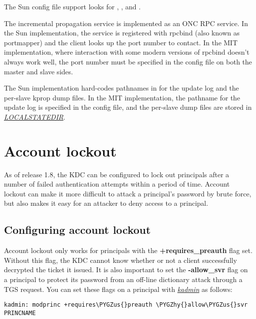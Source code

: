 \documentclass[letterpaper,10pt,english]{sphinxmanual}
\def\PYGZus{\char`\_}
\def\PYGZhy{\char`\-}
\begin{document}
The Sun config file support looks for ,
, and .

The incremental propagation service is implemented as an ONC RPC
service.  In the Sun implementation, the service is registered with
rpcbind (also known as portmapper) and the client looks up the port
number to contact.  In the MIT implementation, where interaction with
some modern versions of rpcbind doesn't always work well, the port
number must be specified in the config file on both the master and
slave sides.

The Sun implementation hard-codes pathnames in  for the
update log and the per-slave kprop dump files.  In the MIT
implementation, the pathname for the update log is specified in the
config file, and the per-slave dump files are stored in
{\hyperref[mitK5defaults:paths]{\emph{LOCALSTATEDIR}}}.


\chapter{Account lockout}
\label{admin/lockout::doc}\label{admin/lockout:account-lockout}
As of release 1.8, the KDC can be configured to lock out principals
after a number of failed authentication attempts within a period of
time.  Account lockout can make it more difficult to attack a
principal's password by brute force, but also makes it easy for an
attacker to deny access to a principal.


\section{Configuring account lockout}
\label{admin/lockout:configuring-account-lockout}
Account lockout only works for principals with the
\textbf{+requires\_preauth} flag set.  Without this flag, the KDC cannot
know whether or not a client successfully decrypted the ticket it
issued.  It is also important to set the \textbf{-allow\_svr} flag on a
principal to protect its password from an off-line dictionary attack
through a TGS request.  You can set these flags on a principal with
{\hyperref[admin/admin_commands/kadmin_local:kadmin-1]{\emph{kadmin}}} as follows:

\begin{Verbatim}[commandchars=\\\{\}]
kadmin: modprinc +requires\PYGZus{}preauth \PYGZhy{}allow\PYGZus{}svr PRINCNAME
\end{Verbatim}
\end{document}
